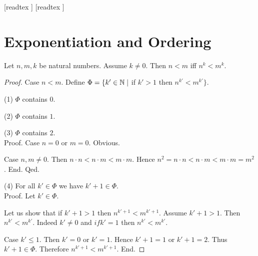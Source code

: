 \documentclass[10pt]{article}
\begin{document}
  \begin{imports}
    \begin{forthel}
      [readtex ]
      [readtex ]
    \end{forthel}
  \end{imports}


  \section*{Exponentiation and Ordering}

  \begin{forthel}
    \begin{proposition}[id=ARITHMETIC_09_3373702288769024,printid]
      Let $n, m, k$ be natural numbers.
      Assume $k \neq 0$.
      Then $n < m$ iff $n^{k} < m^{k}$.
    \end{proposition}
    \begin{proof}
      Case $n < m$.
        Define $\Phi = \{ k' \in \mathbb{N} \mid$ if $k' > 1$ then $n^{k'} < m^{k'} \}$.

        (1) $\Phi$ contains $0$.

        (2) $\Phi$ contains $1$.

        (3) $\Phi$ contains $2$. \\
        Proof.
          Case $n = 0$ or $m = 0$. Obvious.

          Case $n, m \neq 0$.
            Then $n \cdot n
              < n \cdot m
              < m \cdot m$.
            Hence $n^{2}
              = n \cdot n
              < n \cdot m
              < m \cdot m
              = m^{2}$.
          End.
        Qed.

        (4) For all $k' \in \Phi$ we have $k' + 1 \in \Phi$. \\
        Proof.
          Let $k' \in \Phi$.

          Let us show that if $k' + 1 > 1$ then $n^{k' + 1} < m^{k' + 1}$.
            Assume $k' + 1 > 1$.
            Then $n^{k'} < m^{k'}$.
            Indeed $k' \neq 0$ and $if k' = 1$ then $n^{k'} < m^{k'}$.

            Case $k' \leq 1$.
              Then $k' = 0$ or $k' = 1$.
              Hence $k' + 1 = 1$ or $k' + 1 = 2$.
              Thus $k' + 1 \in \Phi$.
              Therefore $n^{k' + 1} < m^{k' + 1}$.
            End.


\end{proof}
\end{forthel}
\end{document}
